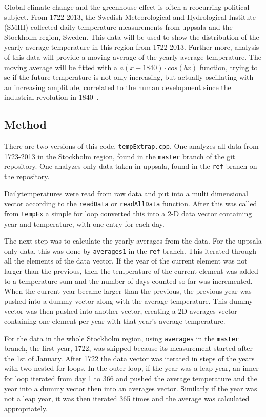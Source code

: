

Global climate change and the greenhouse effect is often a reocurring political subject. From 1722-2013, the Swedish Meteorological and Hydrological Institute (SMHI) collected daily temperature measurements from uppsala and the Stockholm region, Sweden. This data will be used to show the distribution of the yearly average temperature in this region from 1722-2013. Further more, analysis of this data will provide a moving average of the yearly average temperature. The moving average will be fitted with a $a(x-1840)\cdot cos(bx)$ function, trying to se if the future temperature is not only increasing, but actually oscillating with an increasing amplitude, correlated to the human development since the industrial revolution in 1840~\cite{industrial}.

\subsection{Method}
There are two versions of this code, \texttt{tempExtrap.cpp}. One analyzes all data from 1723-2013 in the Stockholm region, found in the \texttt{master} branch of the git repository. One analyzes only data taken in uppsala, found in the \texttt{ref} branch on the repository.

Dailytemperatures were read from raw data and put into a multi dimensional vector according to the \texttt{readData} or \texttt{readAllData} function. After this was called from \texttt{tempEx} a simple for loop converted this into a 2-D data vector containing year and temperature, with one entry for each day.

The next step was to calculate the yearly averages from the data. For the uppsala only data, this was done by \texttt{averages1} in the \texttt{ref} branch. This iterated through all the elements of the data vector. If the year of the current element was not larger than the previous, then the temperature of the current element was added to a temperature sum and the number of days counted so far was incremented. When the current year became larger than the previous, the previous year was pushed into a dummy vector along with the average temperature. This dummy vector was then pushed into another vector, creating a 2D averages vector containing one element per year with that year's average temperature.

For the data in the whole Stockholm region, using \texttt{averages} in the \texttt{master} branch, the first year, 1722, was skipped because its measurement started after the 1st of January. After 1722 the data vector was iterated in steps of the years with two nested for loops. In the outer loop, if the year was a leap year, an inner for loop iterated from day 1 to 366 and pushed the average temperature and the year into a dummy vector then into an averages vector. Similarly if the year was not a leap year, it was then iterated 365 times and the average was calculated appropriately.

